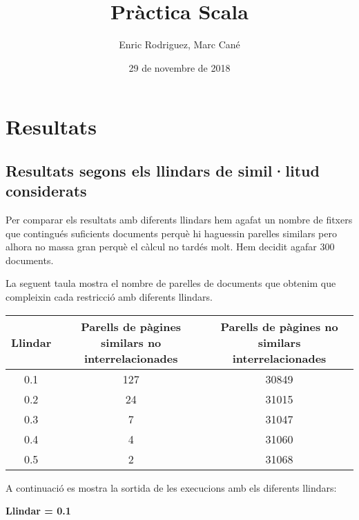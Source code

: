 \documentclass[11pt,a4paper,twoside]{report}
\begin{document}
\title{Pràctica Scala}
\author{Enric Rodriguez, Marc Cané}
\date{29 de novembre de 2018}
\maketitle

\tableofcontents


\chapter{Resultats}

\section{Resultats segons els llindars de simil·litud considerats}

Per comparar els resultats amb diferents llindars hem agafat un nombre de fitxers que contingués suficients documents perquè hi haguessin parelles similars pero alhora no massa gran perquè el càlcul no tardés molt. Hem decidit agafar 300 documents.

La seguent taula mostra el nombre de parelles de documents que obtenim que compleixin cada restricció amb diferents llindars.


\begin{center}
    \begin{tabular}{| c | c | c |}
    \hline
    Llindar & Parells de pàgines similars no interrelacionades & Parells de pàgines no similars interrelacionades \\ \hline 
    0.1 & 127 & 30849 \\ \hline
    0.2 & 24  & 31015 \\ \hline
    0.3 & 7   & 31047 \\ \hline
    0.4 & 4   & 31060 \\ \hline
    0.5 & 2   & 31068 \\
    \hline
    \end{tabular}
\end{center}

A continuació es mostra la sortida de les execucions amb els diferents llindars:
\newline
\newline
\centerline{ \textbf{Llindar = 0.1} }
\end{document}
